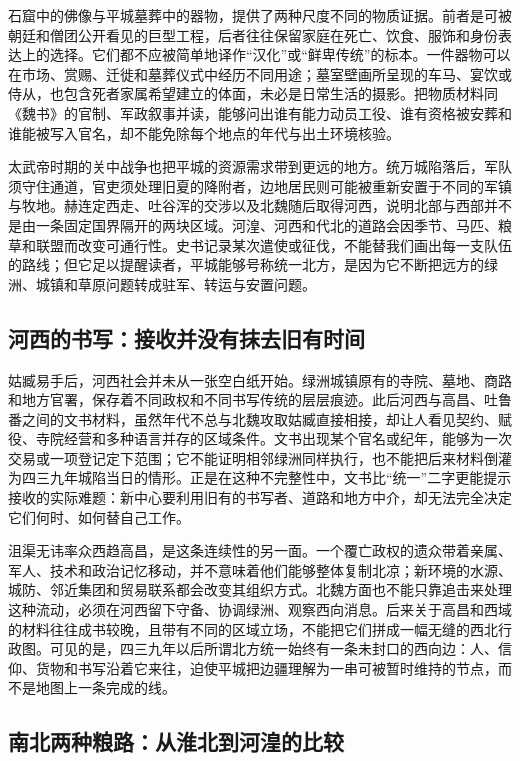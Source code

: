 石窟中的佛像与平城墓葬中的器物，提供了两种尺度不同的物质证据。前者是可被朝廷和僧团公开看见的巨型工程，后者往往保留家庭在死亡、饮食、服饰和身份表达上的选择。它们都不应被简单地译作“汉化”或“鲜卑传统”的标本。一件器物可以在市场、赏赐、迁徙和墓葬仪式中经历不同用途；墓室壁画所呈现的车马、宴饮或侍从，也包含死者家属希望建立的体面，未必是日常生活的摄影。把物质材料同《魏书》的官制、军政叙事并读，能够问出谁有能力动员工役、谁有资格被安葬和谁能被写入官名，却不能免除每个地点的年代与出土环境核验。

太武帝时期的关中战争也把平城的资源需求带到更远的地方。统万城陷落后，军队须守住通道，官吏须处理旧夏的降附者，边地居民则可能被重新安置于不同的军镇与牧地。赫连定西走、吐谷浑的交涉以及北魏随后取得河西，说明北部与西部并不是由一条固定国界隔开的两块区域。河湟、河西和代北的道路会因季节、马匹、粮草和联盟而改变可通行性。史书记录某次遣使或征伐，不能替我们画出每一支队伍的路线；但它足以提醒读者，平城能够号称统一北方，是因为它不断把远方的绿洲、城镇和草原问题转成驻军、转运与安置问题。

\subsection{河西的书写：接收并没有抹去旧有时间}

姑臧易手后，河西社会并未从一张空白纸开始。绿洲城镇原有的寺院、墓地、商路和地方官署，保存着不同政权和不同书写传统的层层痕迹。此后河西与高昌、吐鲁番之间的文书材料，虽然年代不总与北魏攻取姑臧直接相接，却让人看见契约、赋役、寺院经营和多种语言并存的区域条件。文书出现某个官名或纪年，能够为一次交易或一项登记定下范围；它不能证明相邻绿洲同样执行，也不能把后来材料倒灌为四三九年城陷当日的情形。正是在这种不完整性中，文书比“统一”二字更能提示接收的实际难题：新中心要利用旧有的书写者、道路和地方中介，却无法完全决定它们何时、如何替自己工作。

沮渠无讳率众西趋高昌，是这条连续性的另一面。一个覆亡政权的遗众带着亲属、军人、技术和政治记忆移动，并不意味着他们能够整体复制北凉；新环境的水源、城防、邻近集团和贸易联系都会改变其组织方式。北魏方面也不能只靠追击来处理这种流动，必须在河西留下守备、协调绿洲、观察西向消息。后来关于高昌和西域的材料往往成书较晚，且带有不同的区域立场，不能把它们拼成一幅无缝的西北行政图。可见的是，四三九年以后所谓北方统一始终有一条未封口的西向边：人、信仰、货物和书写沿着它来往，迫使平城把边疆理解为一串可被暂时维持的节点，而不是地图上一条完成的线。

\subsection{南北两种粮路：从淮北到河湟的比较}

